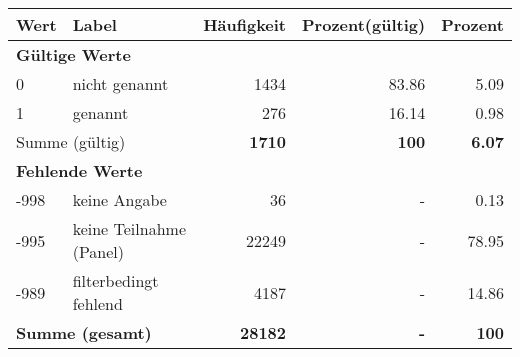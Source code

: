      \begin{longtable}{lXrrr}
     \toprule
     \textbf{Wert} & \textbf{Label} & \textbf{Häufigkeit} & \textbf{Prozent(gültig)} & \textbf{Prozent} \\
     \endhead
     \midrule
     \multicolumn{5}{l}{\textbf{Gültige Werte}}\\

     0 &
     \multicolumn{1}{X}{ nicht genannt   } &


       \num{1434} &
       \num[round-mode=places,round-precision=2]{83.86} &
         \num[round-mode=places,round-precision=2]{5.09} \\

     1 &
     \multicolumn{1}{X}{ genannt   } &


       \num{276} &
       \num[round-mode=places,round-precision=2]{16.14} &
         \num[round-mode=places,round-precision=2]{0.98} \\
     \midrule
     \multicolumn{2}{l}{Summe (gültig)} &
       \textbf{\num{1710}} &
     \textbf{\num{100}} &
       \textbf{\num[round-mode=places,round-precision=2]{6.07}} \\
     \multicolumn{5}{l}{\textbf{Fehlende Werte}}\\
       -998 &
       keine Angabe &
         \num{36} &
        - &
         \num[round-mode=places,round-precision=2]{0.13} \\
       -995 &
       keine Teilnahme (Panel) &
         \num{22249} &
        - &
         \num[round-mode=places,round-precision=2]{78.95} \\
       -989 &
       filterbedingt fehlend &
         \num{4187} &
        - &
         \num[round-mode=places,round-precision=2]{14.86} \\
     \midrule
     \multicolumn{2}{l}{\textbf{Summe (gesamt)}} &
          \textbf{\num{28182}} &
        \textbf{-} &
        \textbf{\num{100}} \\
     \bottomrule
     \end{longtable}
     
